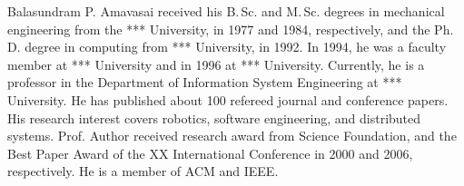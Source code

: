 \documentclass[10pt,journal,compsoc]{joser13}
\begin{document}
\begin{IEEEbiography}[{amavasai}]{Balasundram P. Amavasai}
received his B.\,Sc. and
M.\,Sc. degrees in mechanical engineering from the *** University,
in 1977 and 1984, respectively, and the Ph.\,D. degree in
computing from *** University, in 1992. In 1994, he was a
faculty member at *** University and in 1996 at ***
University. Currently, he is a professor in the Department of
Information System Engineering at *** University.
He has published about 100 refereed journal and conference papers.
His research interest covers robotics, software engineering, and distributed
systems.
Prof. Author received research award from Science Foundation, and
the Best Paper Award of the XX International Conference in 2000 and
2006, respectively. He is a member of ACM and IEEE.
\end{IEEEbiography}



\vfill


\end{document}
